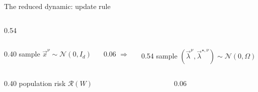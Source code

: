 \documentclass[aspectratio=169,11pt]{beamer}
\begin{document}
\begin{frame}{The reduced dynamic: update rule}
\begin{columns}[c]
    \begin{column}{0.54\textwidth}
    \end{column}
  \end{columns}
  \vspace{0.4em}
  \begin{columns}[c]
    \begin{column}{0.40\textwidth}
      \centering
      sample $\vec{x}^\nu \sim \mathcal{N}(0, I_d)$
    \end{column}
    \begin{column}{0.06\textwidth}
      \centering$\Longrightarrow$
    \end{column}
    \begin{column}{0.54\textwidth}
      \centering
      sample $(\vec{\lambda}^\nu, \vec{\lambda}^{\star,\nu}) \sim \mathcal{N}(0, \Omega)$
    \end{column}
  \end{columns}
  \vspace{0.3em}
  \begin{columns}[c]
    \begin{column}{0.40\textwidth}
      \centering
      population risk $\mathcal{R}(W)$
    \end{column}
    \begin{column}{0.06\textwidth}

\end{column}
\end{columns}
\end{frame}
\end{document}
